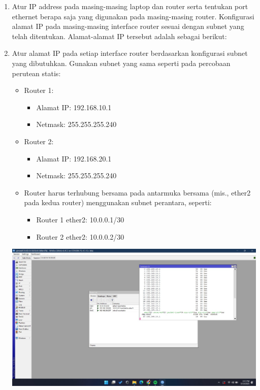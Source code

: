 \begin{enumerate}
\begin{enumerate}
\begin{center}
        \end{center}
        \item Atur IP address
        pada masing-masing laptop dan router serta tentukan port ethernet
        berapa saja yang digunakan pada masing-masing router.
        Konfigurasi alamat IP pada masing-masing 
        interface router sesuai dengan subnet yang telah 
        ditentukan. Alamat-alamat IP tersebut adalah sebagai
        berikut:
        \item Atur alamat IP pada setiap interface router berdasarkan konfigurasi subnet yang dibutuhkan. Gunakan subnet yang sama seperti pada percobaan perutean statis:
        \begin{itemize}
            \item Router 1:
            \begin{itemize}
                \item Alamat IP: 192.168.10.1
                \item Netmask: 255.255.255.240
            \end{itemize}
            \item Router 2:
            \begin{itemize}
                \item Alamat IP: 192.168.20.1
                \item Netmask: 255.255.255.240
            \end{itemize}
            \item Router harus terhubung bersama pada antarmuka bersama (mis., ether2 pada kedua router) menggunakan subnet perantara, seperti:
            \begin{itemize}
                \item Router 1 ether2: 10.0.0.1/30
                \item Router 2 ether2: 10.0.0.2/30
            \end{itemize}
        \end{itemize}
        \begin{center}
		    \includegraphics[scale=0.4]{P1/img/1-2.jpg}

\end{center}
\end{enumerate}
\end{enumerate}
